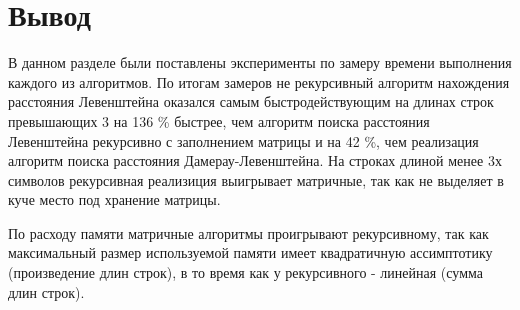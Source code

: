 
    \section{Вывод}
        В данном разделе были поставлены эксперименты по замеру времени
        выполнения каждого из алгоритмов. По итогам замеров не рекурсивный 
        алгоритм нахождения расстояния Левенштейна оказался самым быстродействующим
        на длинах строк превышающих 3 на 136 \% быстрее, чем алгоритм поиска
        расстояния Левенштейна рекурсивно с заполнением матрицы и на 42 \%,
        чем реализация алгоритм поиска расстояния Дамерау-Левенштейна. На строках
        длиной менее 3х символов рекурсивная реализиция выигрывает матричные, так
        как не выделяет в куче место под хранение матрицы.  
        
        По расходу памяти матричные алгоритмы проигрывают рекурсивному, так как
        максимальный размер используемой памяти имеет квадратичную ассимптотику
        (произведение длин строк), в то время как у рекурсивного - линейная (сумма длин строк).


\newpage